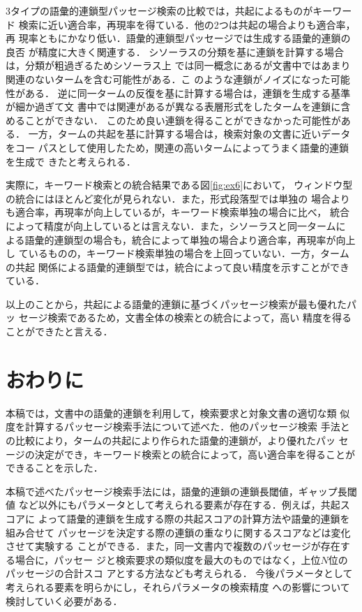 3タイプの語彙的連鎖型パッセージ検索の比較では，共起によるものがキーワード
検索に近い適合率，再現率を得ている．他の2つは共起の場合よりも適合率，再
現率ともにかなり低い．語彙的連鎖型パッセージでは生成する語彙的連鎖の良否
が精度に大きく関連する．
シソーラスの分類を基に連鎖を計算する場合は，分類が粗過ぎるためシソーラス上
では同一概念にあるが文書中ではあまり関連のないタームを含む可能性がある．こ
のような連鎖がノイズになった可能性がある．
逆に同一タームの反復を基に計算する場合は，連鎖を生成する基準が細か過ぎて文
書中では関連があるが異なる表層形式をしたタームを連鎖に含めることができない．
このため良い連鎖を得ることができなかった可能性がある．
一方，タームの共起を基に計算する場合は，検索対象の文書に近いデータをコー
パスとして使用したため，関連の高いタームによってうまく語彙的連鎖を生成で
きたと考えられる．

実際に，キーワード検索との統合結果である図\ref{fig:ex6}において，
ウィンドウ型の統合にはほとんど変化が見られない．また，形式段落型では単独の
場合よりも適合率，再現率が向上しているが，キーワード検索単独の場合に比べ，
統合によって精度が向上しているとは言えない．また，シソーラスと同一タームに
よる語彙的連鎖型の場合も，統合によって単独の場合より適合率，再現率が向上し
ているものの，キーワード検索単独の場合を上回っていない．一方，タームの共起
関係による語彙的連鎖型では，統合によって良い精度を示すことができている．

以上のことから，共起による語彙的連鎖に基づくパッセージ検索が最も優れたパッ
セージ検索であるため，文書全体の検索との統合によって，高い
精度を得ることができたと言える．

\section{おわりに}\label{sec:owarini}
本稿では，文書中の語彙的連鎖を利用して，検索要求と対象文書の適切な類
似度を計算するパッセージ検索手法について述べた．他のパッセージ検索
手法との比較により，タームの共起により作られた語彙的連鎖が，より優れたパッ
セージの決定ができ，キーワード検索との統合によって，高い適合率を得ることが
できることを示した．

本稿で述べたパッセージ検索手法には，語彙的連鎖の連鎖長閾値，ギャップ長閾値
など以外にもパラメータとして考えられる要素が存在する．例えば，共起スコアに
よって語彙的連鎖を生成する際の共起スコアの計算方法や語彙的連鎖を組み合せて
パッセージを決定する際の連鎖の重なりに関するスコアなどは変化させて実験する
ことができる．また，同一文書内で複数のパッセージが存在する場合に，パッセー
ジと検索要求の類似度を最大のものではなく，上位$N$位のパッセージの合計スコ
アとする方法なども考えられる．
今後パラメータとして考えられる要素を明らかにし，それらパラメータの検索精度
への影響について検討していく必要がある．

